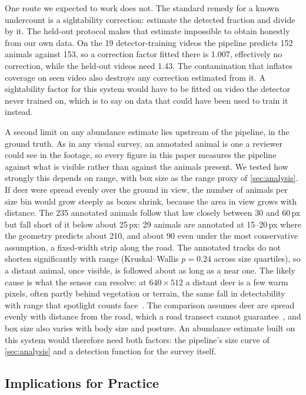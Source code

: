 One route we expected to work does not. The standard remedy for a known undercount is a
sightability correction: estimate the detected fraction and divide by it. The held-out
protocol makes that estimate impossible to obtain honestly from our own data. On the 19
detector-training videos the pipeline predicts 152 animals against 153, so a correction factor
fitted there is 1.007, effectively no correction, while the held-out videos need 1.43. The
contamination that inflates coverage on seen video also destroys any correction estimated from
it. A sightability factor for this system would have to be fitted on video the detector never
trained on, which is to say on data that could have been used to train it instead.

A second limit on any abundance estimate lies upstream of the pipeline, in the ground truth.
As in any visual survey, an annotated animal is one a reviewer could see in the footage, so
every figure in this paper measures the pipeline against what is visible rather than against
the animals present. We tested how strongly this depends on range, with box size as the range
proxy of \cref{sec:analysis}. If deer were spread evenly over the ground in view, the number of
animals per size bin would grow steeply as boxes shrink, because the area in view grows with
distance. The 235 annotated animals follow that law closely between 30 and 60\,px but fall
short of it below about 25\,px: 29 animals are annotated at 15--20\,px where the geometry
predicts about 210, and about 90 even under the most conservative assumption, a fixed-width
strip along the road. The annotated tracks do not shorten significantly with range
(Kruskal--Wallis $p=0.24$ across size quartiles), so a distant animal, once visible, is
followed about as long as a near one. The likely cause is what the sensor can resolve: at
$640\times512$ a distant deer is a few warm pixels, often partly behind vegetation or terrain,
the same fall in detectability with range that spotlight counts
face~\cite{vercauteren2011managing}. The comparison assumes deer are spread evenly with
distance from the road, which a road transect cannot guarantee~\cite{diefenbach2025accounting},
and box size also varies with body size and posture. An abundance estimate built on this
system would therefore need both factors: the pipeline's size curve of \cref{sec:analysis}
and a detection function for the survey itself.

\subsection{Implications for Practice}

